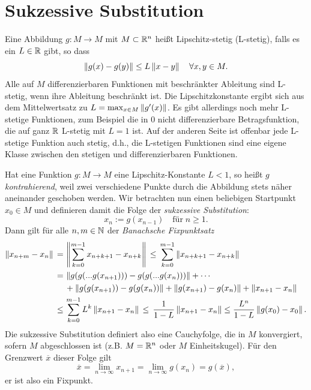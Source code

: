 \section{Sukzessive Substitution}

Eine Abbildung $g:M\to M$ mit $M\subset\mathbb{R}^n$ heißt Lipschitz-stetig
(L-stetig), falls es ein $L\in\mathbb{R}$ gibt, so dass
\begin{equation}
  \left\lVert{g(x) - g(y)}\right\rVert \le L \left\lVert{x - y}\right\rVert\quad\forall x,y\in M.
\end{equation}
Alle auf $M$ differenzierbaren Funktionen mit beschränkter Ableitung
sind L-stetig, wenn ihre Ableitung beschränkt ist. Die
Lipschitzkonstante ergibt sich aus dem Mittelwertsatz zu $L=\max_{x\in
  M}\left\lVert{g'(x)}\right\rVert$.  Es gibt allerdings noch mehr L-stetige Funktionen,
zum Beispiel die in 0 nicht differenzierbare Betragsfunktion, die auf
ganz $\mathbb{R}$ L-stetig mit $L = 1$ ist. Auf der anderen Seite ist
offenbar jede L-stetige Funktion auch stetig, d.h., die L-stetigen
Funktionen sind eine eigene Klasse zwischen den stetigen und
differenzierbaren Funktionen.

 Hat eine Funktion $g:M\to M$ eine
Lipschitz-Konstante $L<1$, so heißt $g$ \emph{kontrahierend}, weil
zwei verschiedene Punkte durch die Abbildung stets näher aneinander
geschoben werden. Wir betrachten nun einen beliebigen Startpunkt
$x_0\in M$ und definieren damit die Folge der \emph{sukzessive Substitution}:
\begin{equation}
  x_{n} := g(x_{n-1}) \quad\text{für}\; n\ge 1.
\end{equation}
Dann gilt für alle $n,m\in\mathbb{N}$ der \emph{Banachsche Fixpunktsatz}
\begin{align}
  \label{eq:banach}
  \left\lVert{x_{n+m} - x_n}\right\rVert \,=\, &\left\lVert{\sum_{k=0}^{m-1} x_{n+k+1} - x_{n+k}}\right\rVert
  \,\le\, \sum_{k=0}^{m-1} \left\lVert{x_{n+k+1} - x_{n+k}}\right\rVert\nonumber\\
  \,=\, &\left\lVert{g(g(...g(x_{n+1}))) - g(g(...g(x_{n})))}\right\rVert
  + \cdots\nonumber\\
  &+ \left\lVert{g(g(x_{n+1})) - g(g(x_{n}))}\right\rVert
  + \left\lVert{g(x_{n+1}) - g(x_{n})}\right\rVert + \left\lVert{x_{n+1} - x_{n}}\right\rVert\nonumber\\
  \le\, &\sum_{k=0}^{m-1} L^k \left\lVert{x_{n+1} - x_{n}}\right\rVert
  \,\le\, \frac{1}{1-L}\left\lVert{x_{n+1} - x_{n}}\right\rVert \le
  \frac{L^n}{1-L}\left\lVert{g(x_0) - x_0}\right\rVert.
\end{align}
Die sukzessive Substitution definiert also eine Cauchyfolge, die in
$M$ konvergiert, sofern $M$ abgeschlossen ist (z.B. $M=\mathbb{R}^n$ oder $M$
Einheitskugel). Für den Grenzwert $\overline{x}$ dieser Folge gilt
\begin{equation}
  \overline{x} = \lim_{n\to\infty}x_{n+1} = \lim_{n\to\infty}g(x_{n})
  = g(\overline{x}),
\end{equation}
er ist also ein Fixpunkt.

